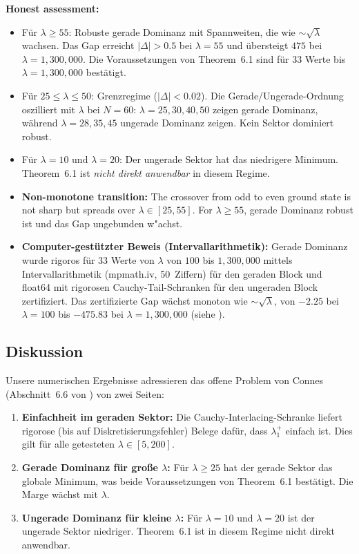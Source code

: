 \documentclass[12pt,a4paper]{article}
\theoremstyle{definition}
\theoremstyle{remark}
\begin{document}
\medskip\noindent
\textbf{Honest assessment:}
\begin{itemize}
  \item Für $\lambda \geq 55$: Robuste gerade Dominanz mit Spannweiten, die wie $\sim\!\sqrt{\lambda}$ wachsen. Das Gap erreicht $|\Delta| > 0.5$ bei $\lambda = 55$ und übersteigt $475$ bei $\lambda = 1{,}300{,}000$. Die Voraussetzungen von Theorem~6.1 sind für $33$ Werte bis $\lambda = 1{,}300{,}000$ bestätigt.
  \item Für $25 \leq \lambda \leq 50$: Grenzregime ($|\Delta| < 0.02$). Die Gerade/Ungerade-Ordnung oszilliert mit $\lambda$ bei $N = 60$: $\lambda = 25, 30, 40, 50$ zeigen gerade Dominanz, während $\lambda = 28, 35, 45$ ungerade Dominanz zeigen. Kein Sektor dominiert robust.
  \item Für $\lambda = 10$ und $\lambda = 20$: Der ungerade Sektor hat das niedrigere Minimum. Theorem~6.1 ist \emph{nicht direkt anwendbar} in diesem Regime.
  \item \textbf{Non-monotone transition:} The crossover from odd to even ground state is not sharp but spreads over $\lambda \in [25, 55]$. For $\lambda \geq 55$, gerade Dominanz robust ist und das Gap ungebunden w"achst.
  \item \textbf{Computer-gestützter Beweis (Intervallarithmetik):} Gerade Dominanz wurde rigoros für $33$ Werte von $\lambda$ von $100$ bis $1{,}300{,}000$ mittels Intervallarithmetik (mpmath.iv, 50~Ziffern) für den geraden Block und float64 mit rigorosen Cauchy-Tail-Schranken für den ungeraden Block zertifiziert. Das zertifizierte Gap wächst monoton wie $\sim\!\sqrt{\lambda}$, von $-2.25$ bei $\lambda = 100$ bis $-475.83$ bei $\lambda = 1{,}300{,}000$ (siehe ).
\end{itemize}

\subsection{Diskussion}

Unsere numerischen Ergebnisse adressieren das offene Problem von Connes (Abschnitt~6.6 von \cite{Connes2026}) von zwei Seiten:
\begin{enumerate}
  \item \textbf{Einfachheit im geraden Sektor:} Die Cauchy-Interlacing-Schranke liefert rigorose (bis auf Diskretisierungsfehler) Belege dafür, dass $\lambda_1^+$ einfach ist. Dies gilt für alle getesteten $\lambda \in [5, 200]$.
  \item \textbf{Gerade Dominanz f\"ur gro\ss e $\lambda$:} F\"ur $\lambda \geq 25$ hat der gerade Sektor das globale Minimum, was beide Voraussetzungen von Theorem~6.1 best\"atigt. Die Marge w\"achst mit $\lambda$.
  \item \textbf{Ungerade Dominanz f\"ur kleine $\lambda$:} F\"ur $\lambda = 10$ und $\lambda = 20$ ist der ungerade Sektor niedriger. Theorem~6.1 ist in diesem Regime nicht direkt anwendbar.
\end{enumerate}
\end{document}
